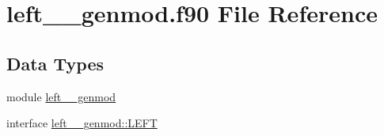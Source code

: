 \hypertarget{left____genmod_8f90}{\section{left\+\_\+\+\_\+genmod.\+f90 File Reference}
\label{left____genmod_8f90}
}
\subsection*{Data Types}
\begin{DoxyCompactItemize}
\item 
module \hyperlink{classleft____genmod}{left\+\_\+\+\_\+genmod}
\item 
interface \hyperlink{interfaceleft____genmod_1_1LEFT}{left\+\_\+\+\_\+genmod\+::\+L\+E\+F\+T}
\end{DoxyCompactItemize}
